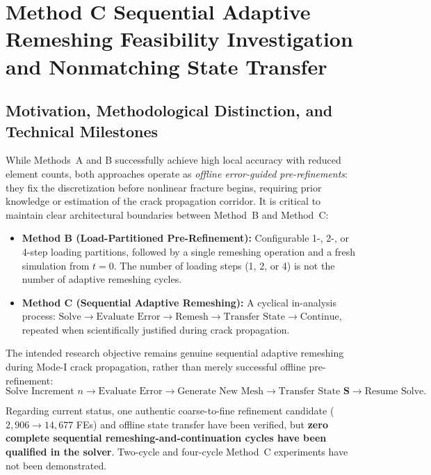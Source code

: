 \section{Method C Sequential Adaptive Remeshing Feasibility Investigation and Nonmatching State Transfer}
\label{sec:method_c_state_transfer}

\subsection{Motivation, Methodological Distinction, and Technical Milestones}
\label{subsec:method_c_motivation}

While Methods~A and B successfully achieve high local accuracy with reduced element counts, both approaches operate as \emph{offline error-guided pre-refinements}: they fix the discretization before nonlinear fracture begins, requiring prior knowledge or estimation of the crack propagation corridor. It is critical to maintain clear architectural boundaries between Method~B and Method~C:
\begin{itemize}
  \item \textbf{Method B (Load-Partitioned Pre-Refinement):} Configurable 1-, 2-, or 4-step loading partitions, followed by a single remeshing operation and a fresh simulation from $t = 0$. The number of loading steps (1, 2, or 4) is not the number of adaptive remeshing cycles.
  \item \textbf{Method C (Sequential Adaptive Remeshing):} A cyclical in-analysis process: $\text{Solve} \to \text{Evaluate Error} \to \text{Remesh} \to \text{Transfer State} \to \text{Continue}$, repeated when scientifically justified during crack propagation.
\end{itemize}

The intended research objective remains genuine sequential adaptive remeshing during Mode-I crack propagation, rather than merely successful offline pre-refinement:
\begin{equation}
  \text{Solve Increment } n \longrightarrow \text{Evaluate Error} \longrightarrow \text{Generate New Mesh} \longrightarrow \text{Transfer State } \mathbf{S} \longrightarrow \text{Resume Solve}.
  \label{eq:sequential_remeshing_cycle}
\end{equation}

Regarding current status, one authentic coarse-to-fine refinement candidate ($2{,}906 \to 14{,}677$ FEs) and offline state transfer have been verified, but \textbf{zero complete sequential remeshing-and-continuation cycles have been qualified in the solver}. Two-cycle and four-cycle Method~C experiments have not been demonstrated.

